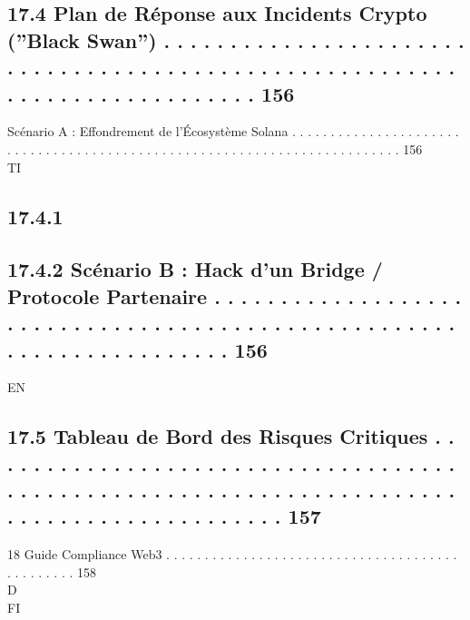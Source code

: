 \documentclass[12pt,landscape,a4paper]{article}
\begin{document}
\subsection{17.4    Plan de Réponse aux Incidents Crypto (”Black Swan”) . . . . . . . . . . . . . . . . . . . . . . . . . . . . . . . . . . . . . . . . . . . . . . . . . . . . . . . . . . . . . . . . . . . . . . . . . . . . 156}
Scénario A : Effondrement de l’Écosystème Solana . . . . . . . . . . . . . . . . . . . . . . . . . . . . . . . . . . . . . . . . . . . . . . . . . . . . . . . . . . . . . . . . . . . . . . . . . 156\\
\vspace{0.5em}
\vspace{0.5em}
\vspace{0.5em}
\vspace{0.5em}
TI\\
\subsection{17.4.1}
\subsection{17.4.2            Scénario B : Hack d’un Bridge / Protocole Partenaire . . . . . . . . . . . . . . . . . . . . . . . . . . . . . . . . . . . . . . . . . . . . . . . . . . . . . . . . . . . . . . . . . . . . . . 156}
\vspace{0.5em}
\vspace{0.5em}
\vspace{0.5em}
\vspace{0.5em}
EN\\
\subsection{17.5    Tableau de Bord des Risques Critiques . . . . . . . . . . . . . . . . . . . . . . . . . . . . . . . . . . . . . . . . . . . . . . . . . . . . . . . . . . . . . . . . . . . . . . . . . . . . . . . . . . . . . . . . . . . 157}
\vspace{0.5em}
18    Guide Compliance Web3 . . . . . . . . . . . . . . . . . . . . . . . . . . . . . . . . . . . . . . . . . . . . . . . 158\\
\vspace{0.5em}
\vspace{0.5em}
\vspace{0.5em}
\vspace{0.5em}
D\\
FI\\
\end{document}
